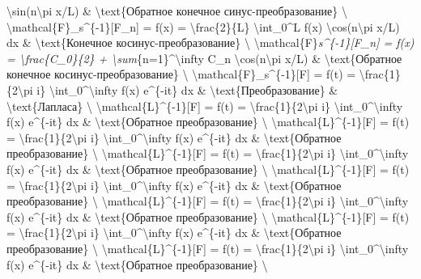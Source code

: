 \documentclass[
]{article}
\begin{document}
{{\begin{enumerate}
  \textbackslash sin(n\textbackslash pi x/L) \&
  \textbackslash text\{Обратное конечное синус-преобразование\}
  \textbackslash{} \textbackslash mathcal\{F\}\_s\^{}\{-1\}{[}F\_n{]} =
  f(x) = \textbackslash frac\{2\}\{L\} \textbackslash int\_0\^{}L f(x)
  \textbackslash cos(n\textbackslash pi x/L) dx \&
  \textbackslash text\{Конечное косинус-преобразование\}
  \textbackslash{}
  \textbackslash mathcal\{F\}\emph{s\^{}\{-1\}{[}F\_n{]} = f(x) =
  \textbackslash frac\{C\_0\}\{2\} +
  \textbackslash sum}\{n=1\}\^{}\textbackslash infty C\_n
  \textbackslash cos(n\textbackslash pi x/L) \&
  \textbackslash text\{Обратное конечное косинус-преобразование\}
  \textbackslash{} \textbackslash mathcal\{F\}\_s\^{}\{-1\}{[}F{]} =
  f(t) = \textbackslash frac\{1\}\{2\textbackslash pi i\}
  \textbackslash int\_0\^{}\textbackslash infty f(x) e\^{}\{-it\} dx \&
  \textbackslash text\{Преобразование\} \&
  \textbackslash text\{Лапласа\} \textbackslash{}
  \textbackslash mathcal\{L\}\^{}\{-1\}{[}F{]} = f(t) =
  \textbackslash frac\{1\}\{2\textbackslash pi i\}
  \textbackslash int\_0\^{}\textbackslash infty f(x) e\^{}\{-it\} dx \&
  \textbackslash text\{Обратное преобразование\} \textbackslash{}
  \textbackslash mathcal\{L\}\^{}\{-1\}{[}F{]} = f(t) =
  \textbackslash frac\{1\}\{2\textbackslash pi i\}
  \textbackslash int\_0\^{}\textbackslash infty f(x) e\^{}\{-it\} dx \&
  \textbackslash text\{Обратное преобразование\} \textbackslash{}
  \textbackslash mathcal\{L\}\^{}\{-1\}{[}F{]} = f(t) =
  \textbackslash frac\{1\}\{2\textbackslash pi i\}
  \textbackslash int\_0\^{}\textbackslash infty f(x) e\^{}\{-it\} dx \&
  \textbackslash text\{Обратное преобразование\} \textbackslash{}
  \textbackslash mathcal\{L\}\^{}\{-1\}{[}F{]} = f(t) =
  \textbackslash frac\{1\}\{2\textbackslash pi i\}
  \textbackslash int\_0\^{}\textbackslash infty f(x) e\^{}\{-it\} dx \&
  \textbackslash text\{Обратное преобразование\} \textbackslash{}
  \textbackslash mathcal\{L\}\^{}\{-1\}{[}F{]} = f(t) =
  \textbackslash frac\{1\}\{2\textbackslash pi i\}
  \textbackslash int\_0\^{}\textbackslash infty f(x) e\^{}\{-it\} dx \&
  \textbackslash text\{Обратное преобразование\} \textbackslash{}
  \textbackslash mathcal\{L\}\^{}\{-1\}{[}F{]} = f(t) =
  \textbackslash frac\{1\}\{2\textbackslash pi i\}
  \textbackslash int\_0\^{}\textbackslash infty f(x) e\^{}\{-it\} dx \&
  \textbackslash text\{Обратное преобразование\} \textbackslash{}
  \textbackslash mathcal\{L\}\^{}\{-1\}{[}F{]} = f(t) =
  \textbackslash frac\{1\}\{2\textbackslash pi i\}
  \textbackslash int\_0\^{}\textbackslash infty f(x) e\^{}\{-it\} dx \&
  \textbackslash text\{Обратное преобразование\} \textbackslash{}

\end{enumerate}}}
\end{document}
